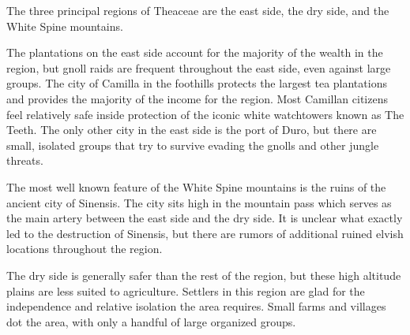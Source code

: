 The three principal regions of Theaceae are the east side, the dry side, and the White Spine mountains.

The plantations on the east side account for the majority of the wealth in the region, but gnoll raids are frequent throughout the east side, even against large groups.
The city of Camilla in the foothills protects the largest tea plantations and provides the majority of the income for the region.
Most Camillan citizens feel relatively safe inside protection of the iconic white watchtowers known as The Teeth.
The only other city in the east side is the port of Duro, but there are small, isolated groups that try to survive evading the gnolls and other jungle threats.

The most well known feature of the White Spine mountains is the ruins of the ancient city of Sinensis.
The city sits high in the mountain pass which serves as the main artery between the east side and the dry side.
It is unclear what exactly led to the destruction of Sinensis, but there are rumors of additional ruined elvish locations throughout the region.

The dry side is generally safer than the rest of the region, but these high altitude plains are less suited to agriculture.
Settlers in this region are glad for the independence and relative isolation the area requires.
Small farms and villages dot the area, with only a handful of large organized groups.
